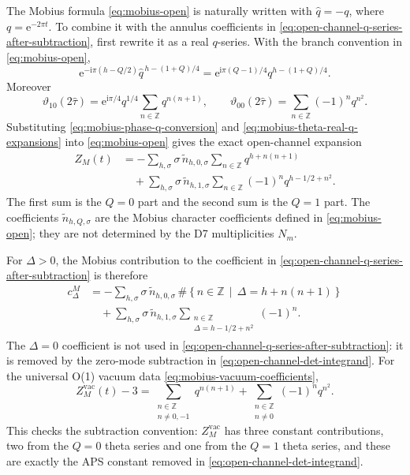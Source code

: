 \documentclass[11pt]{article}
\newcommand{\Z}{\mathbb{Z}}
\newcommand{\wt}{\widetilde}
\newcommand{\vac}{\mathrm{vac}}
\newcommand{\ii}{\mathrm{i}}
\newcommand{\e}{\mathrm{e}}
\newcommand{\vart}{\vartheta}
\newcommand{\hattau}{\widehat{\tau}}
\newcommand{\hatq}{\widehat{q}}
\begin{document}
The Mobius formula \eqref{eq:mobius-open} is naturally written with
\(\hatq=-q\), where \(q=\e^{-2\pi t}\). To combine it with the annulus coefficients in
\eqref{eq:open-channel-q-series-after-subtraction}, first rewrite it as a real \(q\)-series.
With the branch convention in \eqref{eq:mobius-open},
\begin{equation}
  \e^{-\ii\pi(h-Q/2)}\hatq^{\,h-(1+Q)/4}
  =
  \e^{\ii\pi(Q-1)/4}
  q^{h-(1+Q)/4}.
  \label{eq:mobius-phase-q-conversion}
\end{equation}
Moreover
\begin{equation}
  \vart_{10}(2\hattau)
  =
  \e^{\ii\pi/4}
  q^{1/4}
  \sum_{n\in\Z}q^{n(n+1)},
  \qquad
  \vart_{00}(2\hattau)
  =
  \sum_{n\in\Z}(-1)^n q^{n^2}.
  \label{eq:mobius-theta-real-q-expansions}
\end{equation}
Substituting \eqref{eq:mobius-phase-q-conversion} and
\eqref{eq:mobius-theta-real-q-expansions} into \eqref{eq:mobius-open} gives the exact
open-channel expansion
\begin{align}
  Z_M(t)
  &=
  -\sum_{h,\sigma}
  \sigma\,\wt n_{h,0,\sigma}
  \sum_{n\in\Z}q^{h+n(n+1)}
  \nonumber\\
  &\quad
  +
  \sum_{h,\sigma}
  \sigma\,\wt n_{h,1,\sigma}
  \sum_{n\in\Z}(-1)^n q^{h-1/2+n^2}.
  \label{eq:mobius-real-q-series}
\end{align}
The first sum is the \(Q=0\) part and the second sum is the \(Q=1\) part. The coefficients
\(\wt n_{h,Q,\sigma}\) are the Mobius character coefficients defined in \eqref{eq:mobius-open};
they are not determined by the D7 multiplicities \(N_m\).

For \(\Delta>0\), the Mobius contribution to the coefficient in
\eqref{eq:open-channel-q-series-after-subtraction} is therefore
\begin{align}
  c_\Delta^M
  &=
  -\sum_{h,\sigma}
  \sigma\,\wt n_{h,0,\sigma}\,
  \#\left\{
    n\in\Z\,\middle|\,\Delta=h+n(n+1)
  \right\}
  \nonumber\\
  &\quad
  +
  \sum_{h,\sigma}
  \sigma\,\wt n_{h,1,\sigma}
  \sum_{\substack{n\in\Z\\ \Delta=h-1/2+n^2}}
  (-1)^n .
  \label{eq:mobius-open-coefficient}
\end{align}
The \(\Delta=0\) coefficient is not used in
\eqref{eq:open-channel-q-series-after-subtraction}: it is removed by the zero-mode subtraction in
\eqref{eq:open-channel-det-integrand}. For the universal O(1) vacuum data
\eqref{eq:mobius-vacuum-coefficients},
\begin{equation}
  Z_M^{\vac}(t)-3
  =
  \sum_{\substack{n\in\Z\\ n\ne0,-1}}q^{n(n+1)}
  +
  \sum_{\substack{n\in\Z\\ n\ne0}}(-1)^nq^{n^2}.
  \label{eq:mobius-vacuum-positive-q-series}
\end{equation}
This checks the subtraction convention: \(Z_M^{\vac}\) has three constant contributions, two from
the \(Q=0\) theta series and one from the \(Q=1\) theta series, and these are exactly the APS
constant removed in \eqref{eq:open-channel-det-integrand}.
\end{document}
